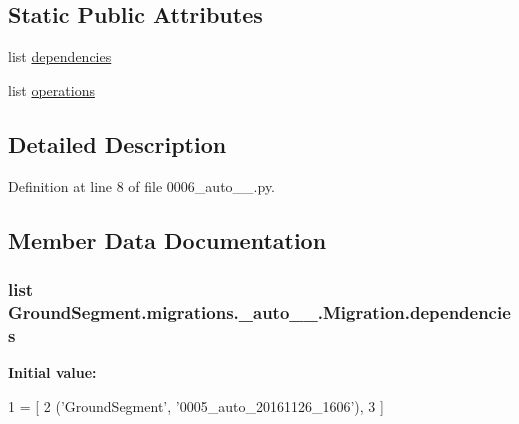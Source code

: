 \subsection*{Static Public Attributes}
\begin{DoxyCompactItemize}
\item 
list \hyperlink{class_ground_segment_1_1migrations_1_10006__auto__20161126__1611_1_1_migration_aa0acebeedcb7270574593396b2e0f2cf}{dependencies}
\item 
list \hyperlink{class_ground_segment_1_1migrations_1_10006__auto__20161126__1611_1_1_migration_abaff5718aa39d36cbbce875a7f90a622}{operations}
\end{DoxyCompactItemize}


\subsection{Detailed Description}


Definition at line 8 of file 0006\+\_\+auto\+\_\+\_.\+py.



\subsection{Member Data Documentation}
\hypertarget{class_ground_segment_1_1migrations_1_10006__auto__20161126__1611_1_1_migration_aa0acebeedcb7270574593396b2e0f2cf}{}
\subsubsection[{dependencies}]{\setlength{\rightskip}{0pt plus 5cm}list Ground\+Segment.\+migrations.\+\_\+auto\+\_\+\_.\+Migration.\+dependencies\hspace{0.3cm}{\ttfamily [static]}}\label{class_ground_segment_1_1migrations_1_10006__auto__20161126__1611_1_1_migration_aa0acebeedcb7270574593396b2e0f2cf}
{\bfseries Initial value\+:}
\begin{DoxyCode}
1 = [
2         (\textcolor{stringliteral}{'GroundSegment'}, \textcolor{stringliteral}{'0005\_auto\_20161126\_1606'}),
3     ]
\end{DoxyCode}


